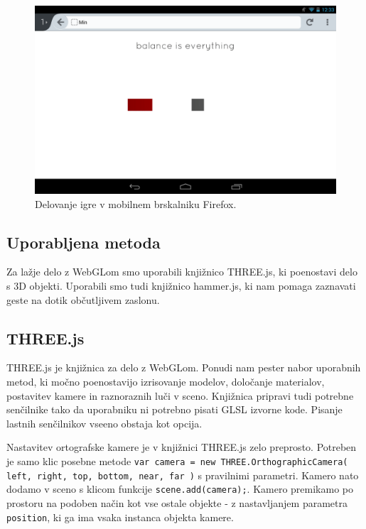\begin{figure}
\begin{center}
\includegraphics[width=12cm]{pic/min-ff.png}
\end{center}
\caption{Delovanje igre v mobilnem brskalniku Firefox.}
\label{minff}
\end{figure}

\subsection{Uporabljena metoda}

Za lažje delo z WebGLom smo uporabili knjižnico THREE.js, ki poenostavi delo s 3D objekti. Uporabili smo tudi knjižnico hammer.js, ki nam pomaga zaznavati geste na dotik občutljivem zaslonu.

\subsection{THREE.js}

THREE.js je knjižnica za delo z WebGLom. Ponudi nam pester nabor uporabnih metod, ki močno poenostavijo izrisovanje modelov, določanje materialov, postavitev kamere in raznoraznih luči v sceno. Knjižnica pripravi tudi potrebne senčilnike tako da uporabniku ni potrebno pisati GLSL izvorne kode. Pisanje lastnih senčilnikov vseeno obstaja kot opcija.

Nastavitev ortografske kamere je v knjižnici THREE.js zelo preprosto. Potreben je samo klic posebne metode \texttt{var camera = new THREE.OrthographicCamera( left, right, top, bottom, near, far )} s pravilnimi parametri. Kamero nato dodamo v sceno s klicom funkcije \texttt{scene.add(camera);}. Kamero premikamo po prostoru na podoben način kot vse ostale objekte - z nastavljanjem parametra \texttt{position}, ki ga ima vsaka instanca objekta kamere.

